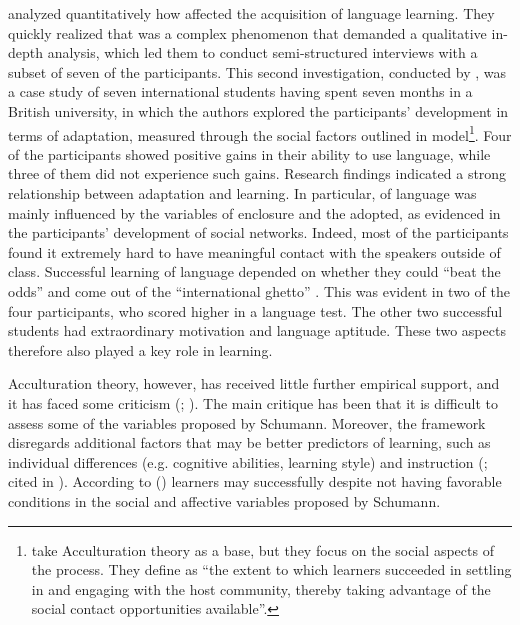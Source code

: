\documentclass[output=paper]{langsci/langscibook}
\begin{document}
\citet{SchmittEtAl2004} analyzed quantitatively how  affected the acquisition of language learning. They quickly realized that  was a complex phenomenon that demanded a qualitative in-depth analysis, which led them to conduct semi-structured interviews with a subset of seven of the participants. This second investigation, conducted by \citet{DörnyeiEtAl2004}, was a case study of seven international students having spent seven months in a British university, in which the authors explored the participants’  development in terms of  adaptation, measured through the social factors outlined in  model\footnote{\citet[88]{DörnyeiEtAl2004} take  Acculturation theory as a base, but they focus on the social aspects of the process. They define  as “the extent to which learners succeeded in settling in and engaging with the host community, thereby taking advantage of the social contact opportunities available”.}. Four of the participants showed positive gains in their ability to use  language, while three of them did not experience such gains. Research findings indicated a strong relationship between  adaptation and  learning. In particular,  of  language was mainly influenced by the variables of enclosure and the  adopted, as evidenced in the participants’ development of social networks. Indeed, most of the participants found it extremely hard to have meaningful contact with the  speakers outside of class. Successful learning of  language depended on whether they could “beat the odds” and come out of the “international ghetto” \citep[105]{DörnyeiEtAl2004}. This was evident in two of the four participants, who scored higher in a  language test. The other two successful students had extraordinary motivation and language aptitude. These two aspects therefore also played a key role in  learning. 

\largerpage
{} Acculturation theory, however, has received little further empirical support, and it has faced some criticism (\citealt{Ellis1994}; \citealt{Zaker2016}). The main critique has been that it is difficult to assess some of the variables proposed by Schumann. Moreover, the framework disregards additional factors that may be better predictors of  learning, such as individual differences (e.g. cognitive abilities, learning style) and instruction (\citealt{Mondy2007}; cited in \citealt{Zaker2016}). According to  (\citeyear{Mondy2007}) learners may  successfully despite not having favorable conditions in the social and affective variables proposed by Schumann. 
\end{document}
